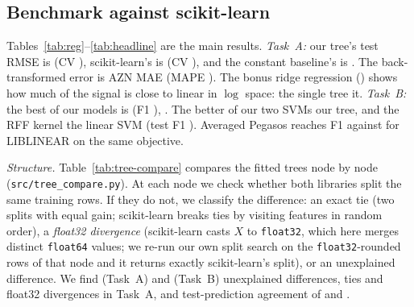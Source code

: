 \documentclass[10pt,twocolumn,a4paper]{article}
\newcommand{\gen}[1]{}
\newcommand{\fit}[1]{\resizebox{\ifdim\width>\linewidth\linewidth\else\width\fi}{!}{#1}}
\begin{document}
\subsection{Benchmark against scikit-learn}
Tables~\ref{tab:reg}--\ref{tab:headline} are the main results.
\emph{Task~A:} our tree's test RMSE is \OurTreeRMSE{} (CV
\CVOurTreeRMSE), scikit-learn's is \SkTreeRMSE{} (CV \CVSkTreeRMSE), and
the constant baseline's is \ConstRMSE. The back-transformed error is
\OurTreeMAEAZN{} AZN MAE (MAPE \OurTreeMAPE). The bonus ridge regression
(\RidgeRMSE) shows how much of the signal is close to linear in
$\log$ space: the single tree \TreeVsRidgeWord{} it. \emph{Task~B:} the
best of our models is \BestOurClf{} (F1 \BestOurClfFOne),
\BestOverallClause. The better of our two SVMs \SVMVsTreeWord{} our tree,
and the RFF kernel \RFFVsLinearWord{} the linear SVM (test F1
\RFFMinusLinear). \AUCContrastSentence{} Averaged Pegasos reaches F1
\OurSVMFOne{} against \SkLinSVCFOne{} for LIBLINEAR on the same objective.

\begin{table}[tp]
  \centering
  \caption{Task A, regression of $\log(\text{price})$. CV:
  \CVFolds-fold mean$\pm$std on train+validation. Test: single held-out
  split with a 95\% bootstrap CI. MAE (AZN) and MAPE after
  back-transformation. Best test RMSE in bold.}
  \label{tab:reg}
  \fit{\gen{tab_results_reg}}
  \vspace{6pt}
  \caption{Task B, price tier (premium = positive class). Same protocol
  as Table~\ref{tab:reg}. Best test F1 in bold. $^\dagger$\SVCNote.}
  \label{tab:clf}
  \fit{\gen{tab_results_clf}}
\end{table}



\begin{table}[t]
  \centering
  \caption{Headline results on both tasks (Task A: RMSE of
  $\log$ price, lower is better; Task B: F1, higher is better).}
  \label{tab:headline}
  \fit{\gen{tab_headline}}
\end{table}

\emph{Structure.} Table~\ref{tab:tree-compare} compares the fitted trees
node by node (\texttt{src/tree\_compare.py}). At each node we check
whether both libraries split the same training rows. If they do not, we
classify the difference: an exact tie (two splits with equal gain;
scikit-learn breaks ties by visiting features in random order), a
\emph{float32 divergence} (scikit-learn casts $X$ to \texttt{float32},
which here merges \FloatCollapsed{} distinct \texttt{float64} values; we
re-run our own split search on the \texttt{float32}-rounded rows of that
node and it returns exactly scikit-learn's split), or an unexplained
difference. We find \RegGainMismatch{} (Task~A) and \ClfGainMismatch{}
(Task~B) unexplained differences, \RegTies{} ties and \RegFloatDiv{} float32
divergences in Task~A, and test-prediction agreement of \RegAgreement{}
and \ClfAgreement. \RootSplitSentence
\end{document}
